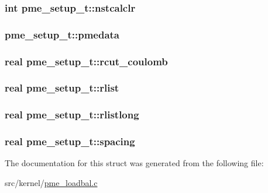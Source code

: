 \hypertarget{structpme__setup__t_a41202462de6d9847a22aeaca57dd3be5}{
\subsubsection[{nstcalclr}]{\setlength{\rightskip}{0pt plus 5cm}int {\bf pme\-\_\-setup\-\_\-t\-::nstcalclr}}}\label{structpme__setup__t_a41202462de6d9847a22aeaca57dd3be5}
\hypertarget{structpme__setup__t_a7414b6b90e6922cf392907179a5a5044}{
\subsubsection[{pmedata}]{ {\bf pme\-\_\-setup\-\_\-t\-::pmedata}}}\label{structpme__setup__t_a7414b6b90e6922cf392907179a5a5044}
\hypertarget{structpme__setup__t_a10b26bc4762a645db835d9e55df7324c}{
\subsubsection[{rcut\-\_\-coulomb}]{\setlength{\rightskip}{0pt plus 5cm}real {\bf pme\-\_\-setup\-\_\-t\-::rcut\-\_\-coulomb}}}\label{structpme__setup__t_a10b26bc4762a645db835d9e55df7324c}
\hypertarget{structpme__setup__t_a01a006cd83c234af97b61b5993c844b4}{
\subsubsection[{rlist}]{\setlength{\rightskip}{0pt plus 5cm}real {\bf pme\-\_\-setup\-\_\-t\-::rlist}}}\label{structpme__setup__t_a01a006cd83c234af97b61b5993c844b4}
\hypertarget{structpme__setup__t_ab4a46ea523127243e4de38674a879160}{
\subsubsection[{rlistlong}]{\setlength{\rightskip}{0pt plus 5cm}real {\bf pme\-\_\-setup\-\_\-t\-::rlistlong}}}\label{structpme__setup__t_ab4a46ea523127243e4de38674a879160}
\hypertarget{structpme__setup__t_ad20a98a5caee6d6ec79b9337e6ba5aee}{
\subsubsection[{spacing}]{\setlength{\rightskip}{0pt plus 5cm}real {\bf pme\-\_\-setup\-\_\-t\-::spacing}}}\label{structpme__setup__t_ad20a98a5caee6d6ec79b9337e6ba5aee}


\-The documentation for this struct was generated from the following file\-:\begin{DoxyCompactItemize}
\item 
src/kernel/\hyperlink{pme__loadbal_8c}{pme\-\_\-loadbal.\-c}\end{DoxyCompactItemize}
